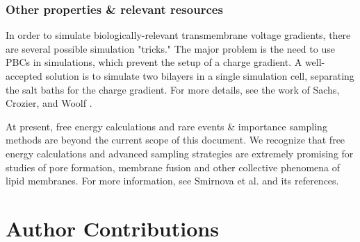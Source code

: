 \documentclass[9pt,bestpractices]{livecoms}
\begin{document}
\subsubsection{Other properties \& relevant resources}
\label{subsubsec:otherprops}
In order to simulate biologically-relevant transmembrane voltage gradients, there are several possible simulation "tricks."
The major problem is the need to use PBCs in simulations, which prevent the setup of a charge gradient.
A well-accepted solution is to simulate two bilayers in a single simulation cell, separating the salt baths for the charge gradient.
For more details, see the work of Sachs, Crozier, and Woolf \cite{Sachs2004}.

At present, free energy calculations and rare events \& importance sampling methods are beyond the current scope of this document.
We recognize that free energy calculations and advanced sampling strategies are extremely promising for studies of pore formation, membrane fusion and other collective phenomena of lipid membranes.
For more information, see Smirnova et al. \cite{Smirnova2015} and its references\cite{Venable2015,Marrink2004}.


%
%





\section{Author Contributions}
%
\end{document}
